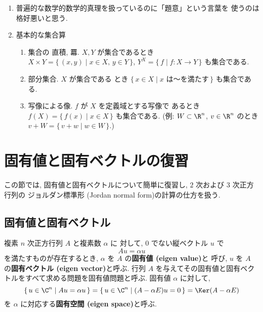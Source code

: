 \documentclass[12pt,twoside]{jarticle}
\begin{document}
\begin{enumerate}
\item 普遍的な数学的数学的真理を扱っているのに「題意」という言葉を
  使うのは格好悪いと思う.

\item 基本的な集合算
  \begin{enumerate}
  \item 集合の
    直積, 羃. 
    $X,Y$ が集合であるとき \\%
    $X\times Y=\{\,(x,y)\mid x\in X,\, y\in Y\,\}$, %
    $Y^X=\{\, f \mid f:X\to Y \,\}$ も集合である. 
  \item 部分集合. $X$ が集合である
    とき $\{\,x\in X\mid \text{$x$ は〜を満たす}\,\}$ も集合である.
  \item 写像による像. $f$ が $X$ を定義域とする写像で
    あるとき $f(X)=\{\, f(x)\mid x\in X\,\}$ も集合である.
    (例: $W\subset\R^n$, $v\in\R^n$ のとき $v+W=\{\,v+w\mid w\in W\,\}$.)
  \end{enumerate}
\end{enumerate}


\section{固有値と固有ベクトルの復習}

この節では, 固有値と固有ベクトルについて簡単に復習し, 
$2$ 次および $3$ 次正方行列の
ジョルダン標準形 (Jordan normal form)の計算の仕方を扱う.


\subsection{固有値と固有ベクトル}

複素 $n$ 次正方行列 $A$ と複素数 $\alpha$ に
対して, $0$ でない縦ベクトル $u$ で
\begin{equation*}
  A u = \alpha u
\end{equation*}
を満たすものが存在するとき,  $\alpha$ を $A$ の{\bf 固有値 (eigen value)}と
呼び, $u$ を $A$ の{\bf 固有ベクトル (eigen vector)}と呼ぶ.
行列 $A$ を与えてその固有値と固有ベクトルをすべて求める問題を固有値問題と呼ぶ.
固有値 $\alpha$ に対して,
\begin{equation*}
  \{\, u\in\C^n \mid Au = \alpha u \,\}
  = \{\, u\in\C^n \mid (A-\alpha E)u = 0 \,\}
  = \Ker(A - \alpha E)
\end{equation*}
を $\alpha$ に対応する{\bf 固有空間 (eigen space)}と呼ぶ.
\end{document}
